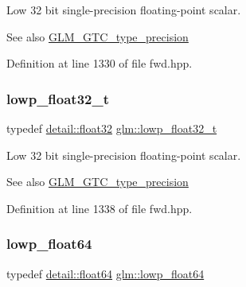 Low 32 bit single-\/precision floating-\/point scalar. \begin{DoxySeeAlso}{See also}
\hyperlink{group__gtc__type__precision}{G\+L\+M\+\_\+\+G\+T\+C\+\_\+type\+\_\+precision} 
\end{DoxySeeAlso}


Definition at line 1330 of file fwd.\+hpp.

\mbox{\label{group__gtc__type__precision_gadfb453b23cb820e3e4e766e047c67dab}} 
\subsubsection{\texorpdfstring{lowp\+\_\+float32\+\_\+t}{lowp\_float32\_t}}
{\footnotesize\ttfamily typedef \hyperlink{namespaceglm_1_1detail_ad60558c5c304624de0b54c51b5857737}{detail\+::float32} \hyperlink{group__gtc__type__precision_gadfb453b23cb820e3e4e766e047c67dab}{glm\+::lowp\+\_\+float32\+\_\+t}}

Low 32 bit single-\/precision floating-\/point scalar. \begin{DoxySeeAlso}{See also}
\hyperlink{group__gtc__type__precision}{G\+L\+M\+\_\+\+G\+T\+C\+\_\+type\+\_\+precision} 
\end{DoxySeeAlso}


Definition at line 1338 of file fwd.\+hpp.

\mbox{\label{group__gtc__type__precision_ga32e02689f4e83fb269c9047418536f2c}} 
\subsubsection{\texorpdfstring{lowp\+\_\+float64}{lowp\_float64}}
{\footnotesize\ttfamily typedef \hyperlink{namespaceglm_1_1detail_a5a0a9a1be3fd5dbe6d47ae45c3022b06}{detail\+::float64} \hyperlink{group__gtc__type__precision_ga32e02689f4e83fb269c9047418536f2c}{glm\+::lowp\+\_\+float64}}

